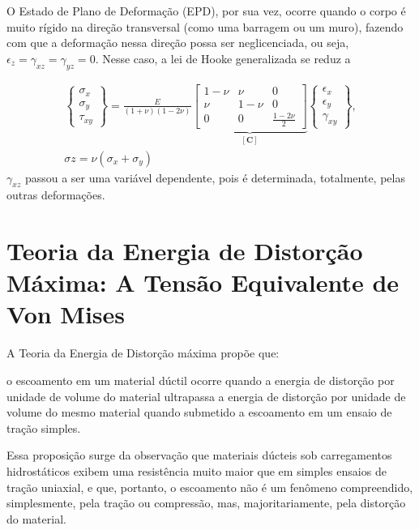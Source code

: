 O Estado de Plano de Deformação (EPD), por sua vez, ocorre quando o corpo é muito rígido na direção transversal (como uma barragem ou um muro), fazendo com que a deformação nessa direção possa ser neglicenciada, ou seja, $\epsilon_z = \gamma_{xz} = \gamma_{yz} = 0$. Nesse caso, a lei de Hooke generalizada se reduz a

\begin{gather}
    \begin{Bmatrix}
        \sigma_x \\
        \sigma_y \\
        \tau_{xy}
    \end{Bmatrix} = \frac{E}{(1+\nu)(1-2\nu)} 
    \underbrace{\begin{bmatrix}
        1 - \nu & \nu & 0 \\
        \nu & 1 - \nu & 0 \\
        0 & 0 & \frac{1-2\nu}{2}
    \end{bmatrix}}_{[\bm{C}]}
    \begin{Bmatrix}
        \epsilon_x \\
        \epsilon_y \\
        \gamma_{xy}
    \end{Bmatrix}, \\
    \sigma{z} = \nu (\sigma_x + \sigma_y)
\end{gather}
$\gamma_{xz}$ passou a ser uma variável dependente, pois é determinada, totalmente, pelas outras deformações.  \cite[pág. 91]{Zin}

\section{Teoria da Energia de Distorção Máxima: A Tensão Equivalente de Von Mises}

A Teoria da Energia de Distorção máxima propõe que:
\begin{citacao}
    o escoamento em um material dúctil ocorre quando a energia de distorção por unidade de volume do material ultrapassa a energia de distorção por unidade de volume do mesmo material quando submetido a escoamento em um ensaio de tração simples. \cite{Hibbeler}
\end{citacao}

Essa proposição surge da observação que materiais dúcteis sob carregamentos hidrostáticos exibem uma resistência muito maior que em simples ensaios de tração uniaxial, e que, portanto, o escoamento não é um fenômeno compreendido, simplesmente, pela tração ou compressão, mas, majoritariamente, pela distorção do material. \cite{Hibbeler}

